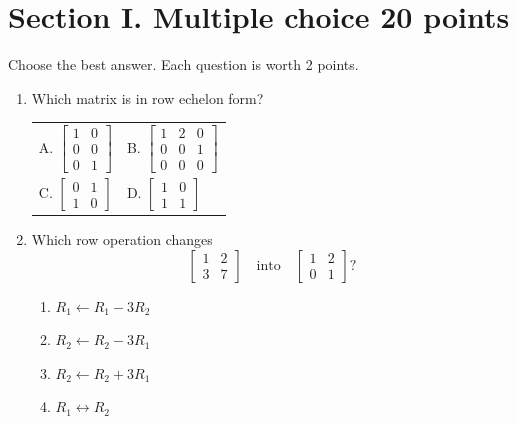 \documentclass[11pt]{article}
\newif\ifshowsolutions
\newcommand{\mcneedspace}{\ifshowsolutions\Needspace{12\baselineskip}\fi}
\newcommand{\solution}[1]{%
  \ifshowsolutions
    \par\medskip
    {\color{solutionblue}\textbf{Solution.} #1}
    \par\medskip
  \fi}
\begin{document}
\newpage

\section*{Section I. Multiple choice \hfill 20 points}

\begingroup\small
Choose the best answer. Each question is worth 2 points.

\begin{enumerate}
\mcneedspace
\item Which matrix is in row echelon form?
\begin{center}
\begin{tabular}{@{}p{.45\linewidth}p{.45\linewidth}@{}}
A. $\begin{bmatrix}1&0\\0&0\\0&1\end{bmatrix}$ &
B. $\begin{bmatrix}1&2&0\\0&0&1\\0&0&0\end{bmatrix}$ \\[1.5em]
C. $\begin{bmatrix}0&1\\1&0\end{bmatrix}$ &
D. $\begin{bmatrix}1&0\\1&1\end{bmatrix}$
\end{tabular}
\end{center}
\solution{\textbf{B.} The leading entries move to the right as the rows descend, and all entries below each pivot are zero.}

\mcneedspace
\item Which row operation changes
\[
\begin{bmatrix}1&2\\3&7\end{bmatrix}
\quad\text{into}\quad
\begin{bmatrix}1&2\\0&1\end{bmatrix}?
\]
\begin{enumerate}[label=\Alph*.]
  \item $R_1\leftarrow R_1-3R_2$
  \item $R_2\leftarrow R_2-3R_1$
  \item $R_2\leftarrow R_2+3R_1$
  \item $R_1\leftrightarrow R_2$
\end{enumerate}
\solution{\textbf{B.} The new second row is $(3,7)-3(1,2)=(0,1)$.}


\end{enumerate}
\end{document}
